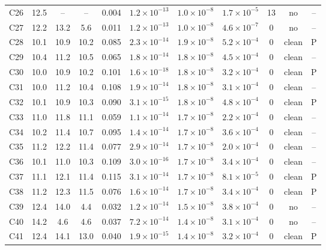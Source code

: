 \documentclass[twocolumn,epjc3]{svjour3}
\begin{document}
\begin{table}[t]
\begin{tabular}{lcccccccccc}
C26 & 12.5 & -- & -- & 0.004 & $1.2\!\times\!10^{-13}$ & $1.0\!\times\!10^{-8}$ & $1.7\!\times\!10^{-5}$ & 13 & no & --\\
C27 & 12.2 & 13.2 & 5.6 & 0.011 & $1.2\!\times\!10^{-13}$ & $1.0\!\times\!10^{-8}$ & $4.6\!\times\!10^{-7}$ & 0 & no & --\\
C28 & 10.1 & 10.9 & 10.2 & 0.085 & $2.3\!\times\!10^{-14}$ & $1.9\!\times\!10^{-8}$ & $5.2\!\times\!10^{-4}$ & 0 & clean & P\\
C29 & 10.4 & 11.2 & 10.5 & 0.065 & $1.8\!\times\!10^{-14}$ & $1.8\!\times\!10^{-8}$ & $4.5\!\times\!10^{-4}$ & 0 & clean & --\\
C30 & 10.0 & 10.9 & 10.2 & 0.101 & $1.6\!\times\!10^{-18}$ & $1.8\!\times\!10^{-8}$ & $3.2\!\times\!10^{-4}$ & 0 & clean & P\\
C31 & 10.0 & 11.2 & 10.4 & 0.108 & $1.9\!\times\!10^{-14}$ & $1.8\!\times\!10^{-8}$ & $3.1\!\times\!10^{-4}$ & 0 & clean & --\\
C32 & 10.1 & 10.9 & 10.3 & 0.090 & $3.1\!\times\!10^{-15}$ & $1.8\!\times\!10^{-8}$ & $4.8\!\times\!10^{-4}$ & 0 & clean & P\\
C33 & 11.0 & 11.8 & 11.1 & 0.059 & $1.1\!\times\!10^{-14}$ & $1.7\!\times\!10^{-8}$ & $2.2\!\times\!10^{-4}$ & 0 & clean & --\\
C34 & 10.2 & 11.4 & 10.7 & 0.095 & $1.4\!\times\!10^{-14}$ & $1.7\!\times\!10^{-8}$ & $3.6\!\times\!10^{-4}$ & 0 & clean & --\\
C35 & 11.2 & 12.2 & 11.4 & 0.077 & $2.9\!\times\!10^{-14}$ & $1.7\!\times\!10^{-8}$ & $2.0\!\times\!10^{-4}$ & 0 & clean & --\\
C36 & 10.1 & 11.0 & 10.3 & 0.109 & $3.0\!\times\!10^{-16}$ & $1.7\!\times\!10^{-8}$ & $3.4\!\times\!10^{-4}$ & 0 & clean & --\\
C37 & 11.1 & 12.1 & 11.4 & 0.115 & $3.1\!\times\!10^{-14}$ & $1.7\!\times\!10^{-8}$ & $8.1\!\times\!10^{-5}$ & 0 & clean & P\\
C38 & 11.2 & 12.3 & 11.5 & 0.076 & $1.6\!\times\!10^{-14}$ & $1.7\!\times\!10^{-8}$ & $3.4\!\times\!10^{-4}$ & 0 & clean & P\\
C39 & 12.4 & 14.0 & 4.4 & 0.032 & $1.2\!\times\!10^{-14}$ & $1.5\!\times\!10^{-8}$ & $3.8\!\times\!10^{-4}$ & 0 & no & --\\
C40 & 14.2 & 4.6 & 4.6 & 0.037 & $7.2\!\times\!10^{-14}$ & $1.4\!\times\!10^{-8}$ & $3.1\!\times\!10^{-4}$ & 0 & no & --\\
C41 & 12.4 & 14.1 & 13.0 & 0.040 & $1.9\!\times\!10^{-15}$ & $1.4\!\times\!10^{-8}$ & $3.2\!\times\!10^{-4}$ & 0 & clean & P\\

\end{tabular}
\end{table}
\end{document}
